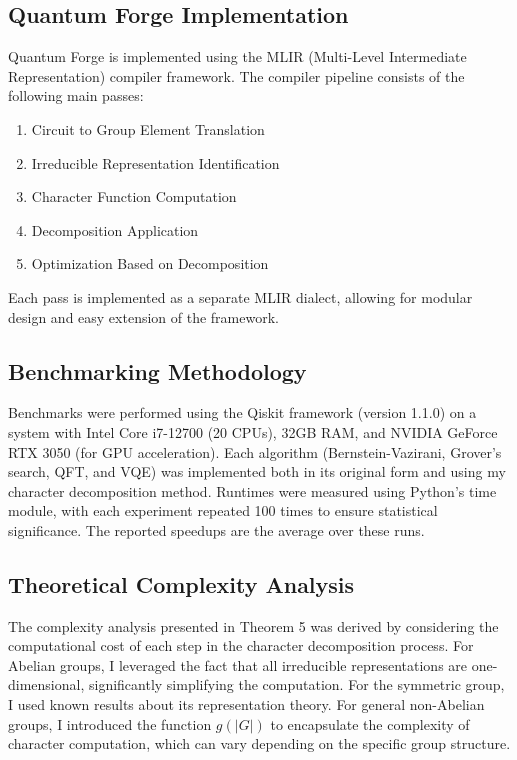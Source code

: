 \documentclass[11pt,a4paper]{article}
\begin{document}
\subsection{Quantum Forge Implementation}
Quantum Forge is implemented using the MLIR (Multi-Level Intermediate Representation) compiler framework\cite{MLIR2020}. The compiler pipeline consists of the following main passes:
\begin{enumerate}
\item Circuit to Group Element Translation
\item Irreducible Representation Identification
\item Character Function Computation
\item Decomposition Application
\item Optimization Based on Decomposition
\end{enumerate}
Each pass is implemented as a separate MLIR dialect, allowing for modular design and easy extension of the framework.

\subsection{Benchmarking Methodology}
Benchmarks were performed using the Qiskit framework (version 1.1.0) on a system with Intel Core i7-12700 (20 CPUs), 32GB RAM, and NVIDIA GeForce RTX 3050 (for GPU acceleration). Each algorithm (Bernstein-Vazirani, Grover's search, QFT, and VQE) was implemented both in its original form and using my character decomposition method. Runtimes were measured using Python's time module, with each experiment repeated 100 times to ensure statistical significance. The reported speedups are the average over these runs.

\subsection{Theoretical Complexity Analysis}
The complexity analysis presented in Theorem 5 was derived by considering the computational cost of each step in the character decomposition process. For Abelian groups, I leveraged the fact that all irreducible representations are one-dimensional, significantly simplifying the computation. For the symmetric group, I used known results about its representation theory. For general non-Abelian groups, I introduced the function $g(|G|)$ to encapsulate the complexity of character computation, which can vary depending on the specific group structure.
\end{document}
